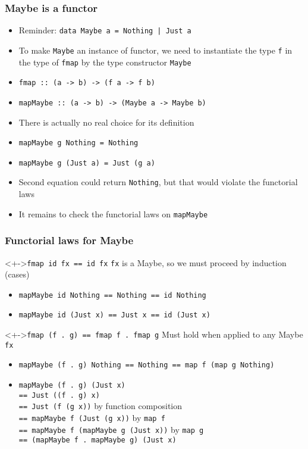 \documentclass{beamer}
\begin{document}
\begin{frame}
  \frametitle{Maybe is a functor}
  \begin{itemize}[<+->]
  \item Reminder: \lstinline$data Maybe a = Nothing | Just a$
  \item To make \lstinline$Maybe$ an instance of functor, we need to instantiate
    the type \lstinline$f$ in the type of \lstinline|fmap| by the type constructor
    \lstinline|Maybe|
  \item \lstinline|fmap :: (a -> b) -> (f a -> f b)|
  \item \lstinline|mapMaybe :: (a -> b) -> (Maybe a -> Maybe b)|
  \item There is actually no real choice for its definition
  \item \lstinline|mapMaybe g Nothing = Nothing|
  \item \lstinline|mapMaybe g (Just a) = Just (g a)| 
  \item Second equation could return \lstinline$Nothing$, but that
    would violate the functorial laws
  \item It remains to check the functorial laws on \lstinline|mapMaybe|
  \end{itemize}
\end{frame}
\begin{frame}[fragile]
  \frametitle{Functorial laws for Maybe}
  \begin{block}<+->{\lstinline$fmap id fx == id fx$}
    \lstinline$fx$ is a Maybe, so we must proceed by induction (cases)
    \begin{itemize}
    \item \lstinline$mapMaybe id Nothing == Nothing == id Nothing$
    \item \lstinline$mapMaybe id (Just x) == Just x == id (Just x)$
    \end{itemize}
  \end{block}
  \begin{block}<+->{\lstinline$fmap (f . g) == fmap f . fmap g$}
    Must hold when applied to any Maybe \lstinline$fx$
    \begin{itemize}
    \item \lstinline$mapMaybe (f . g) Nothing == Nothing == map f (map g Nothing)$
    \item \lstinline$mapMaybe (f . g) (Just x)$ \\
      \lstinline$== Just ((f . g) x)$ 
      \\
      \lstinline$== Just (f (g x))$ by function composition
      \\
      \lstinline$== mapMaybe f (Just (g x))$ by \lstinline$map f$
      \\
      \lstinline$== mapMaybe f (mapMaybe g (Just x))$ by \lstinline$map g$
      \\
      \lstinline$== (mapMaybe f . mapMaybe g) (Just x)$
    \end{itemize}
  \end{block}
\end{frame}
\end{document}
